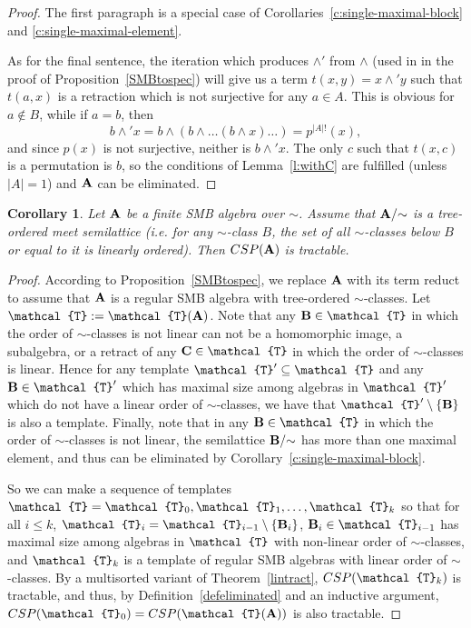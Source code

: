 \documentclass[11pt]{amsart}
\newcommand{\m}[1]{{\uppercase {\mathbf {#1}}}}
\newcommand{\vr}[1]{{\uppercase {\mathcal{#1}}}}
\newcommand{\mt}{\wedge}
\newtheorem{cor}[thm]{Corollary}
\theoremstyle{definition}
\begin{document}
\begin{proof}
The first paragraph is a special case of Corollaries~\ref{c:single-maximal-block} and \ref{c:single-maximal-element}.

As for the final sentence, the iteration which produces $\mt'$ from $\mt$ (used in \cite{SMB1} in the proof of Proposition~\ref{SMBtospec}) will give us a term $t(x,y)=x\mt' y$ such that $t(a,x)$ is a retraction which is not surjective for any $a\in A$. This is obvious for $a\notin B$, while if $a=b$, then $$b\mt' x=b\mt (b\mt \dots(b\mt x)\dots)=p^{|A|!}(x),$$
and since $p(x)$ is not surjective, neither is $b\mt' x$. The only $c$ such that $t(x,c)$ is a permutation is $b$, so the conditions of Lemma~\ref{l:withC} are fulfilled (unless $|A|=1$) and $\m a$ can be eliminated.
\end{proof}

\begin{cor}\label{treetract}
Let $\m a$ be a finite SMB algebra over $\sim$. Assume that $\m a/{\sim}$ is a tree-ordered meet semilattice (i.e. for any $\sim$-class $B$, the set of all $\sim$-classes below $B$ or equal to it is linearly ordered). Then $CSP(\m a)$ is tractable.
\end{cor}

\begin{proof}
According to Proposition~\ref{SMBtospec}, we replace $\m a$ with its term reduct to assume that $\m a$ is a regular SMB algebra with tree-ordered $\sim$-classes. Let $\vr t:=\vr t(\m a)$. Note that any $\m b\in \vr t$ in which the order of ${\sim}$-classes is not linear can not be a homomorphic image, a subalgebra, or a retract of any $\m c\in \vr t$ in which the order of ${\sim}$-classes is linear. Hence for any template $\vr t'\subseteq \vr t$ and any $\m b\in \vr t'$ which has maximal size among algebras in $\vr t'$ which do not have a linear order of $\sim$-classes, we have that $\vr t'\setminus\{\m b\}$ is also a template. Finally, note that in any $\m b\in\vr t$ in which the order of ${\sim}$-classes is not linear, the semilattice $\m b/{\sim}$ has more than one maximal element, and thus can be eliminated by Corollary~\ref{c:single-maximal-block}. 

So we can make a sequence of templates $\vr t=\vr t_0,\vr t_1,\dots,\vr t_k$ so that for all $i\leq k$, $\vr t_i=\vr t_{i-1}\setminus \{\m b_i\}$, $\m b_i\in\vr t_{i-1}$ has maximal size among algebras in $\vr t$ with non-linear order of ${\sim}$-classes, and $\vr t_k$ is a template of regular SMB algebras with linear order of $\sim$-classes. By a multisorted variant of Theorem~\ref{lintract}, $CSP(\vr t_k)$ is tractable, and thus, by Definition~\ref{defeliminated} and an inductive argument, $CSP(\vr t_0)=CSP(\vr t(\m a))$ is also tractable.
\end{proof}
\end{document}
